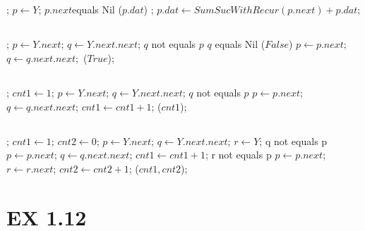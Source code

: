\subsection{}
\Prog\qq     %
; \p
$p \leftarrow Y$;\p
\If $p.next $equals Nil \Then\p
\Return($p.dat$) ;\p
\Else\p
$p.dat \leftarrow SumSucWithRecur(p.next) + p.dat$;\p
\Endif\qq
\Fini

\subsection{}
\Prog\qq     %
; \p
$p \leftarrow Y.next$;\p
$q \leftarrow Y.next.next$;\p
\While $q$ not equals $p$ \Do\p
\If $q$ equals Nil \Then\p
\Return($False$)\p
\Endif\p
$p \leftarrow p.next;$\p
$q \leftarrow q.next.next;$\p
\Endwhile\p
\Return($True$);\qq
\Fini

\subsection{}
\Prog\qq     %
; \p
$cnt1 \leftarrow 1$;\p
$p \leftarrow Y.next$;\p
$q \leftarrow Y.next.next$;\p
\While $q$ not equals $p$ \Do\p
$p \leftarrow p.next$;\p
$q \leftarrow q.next.next$;\p
$cnt1 \leftarrow cnt1 + 1$;\p
\Endwhile\p
\Return($cnt1$);\qq
\Fini

\subsection{}
\Prog\qq     %
; \p
$cnt1 \leftarrow 1$;\p
$cnt2 \leftarrow 0$;\p
$p \leftarrow Y.next$;\p
$q \leftarrow Y.next.next$;\p
$r \leftarrow Y$;\p
\While q not equals p \Do\p
$p \leftarrow p.next$;\p
$q \leftarrow q.next.next$;\p
$cnt1 \leftarrow cnt1 + 1$;\p
\Endwhile\p
\While r not equals p \Do\p
$p \leftarrow p.next$;\p
$r \leftarrow r.next$;\p
$cnt2 \leftarrow cnt2 + 1$;\p
\Endwhile\p
\Return($cnt1, cnt2$);\qq
\Fini


\section{EX 1.12}

